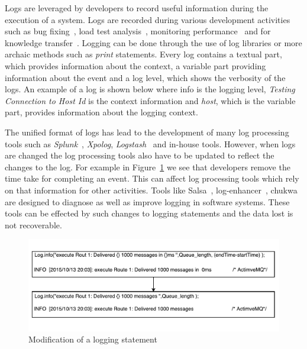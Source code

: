 Logs are leveraged by developers to record useful information during the execution of a system. Logs are recorded during various development activities such as bug fixing~\cite{ConsoleLogs,JGLouMining,QFuanomaly}, load test analysis~\cite{Automatic}, monitoring performance~\cite{Yuan} and for knowledge transfer~\cite{IanWCRE}.
Logging can be done through the use of log libraries or more archaic methods such as \textsl{print} statements. Every log contains a textual part, which provides information about the context, a variable part providing information about the event and a log level, which shows the verbosity of the logs. An example of a log is shown below where info is the logging level, \textsl{Testing Connection to Host Id} is the context information and \textsl{host}, which is the variable part, provides information about the logging context.

The unified format of logs has lead to the development of many log processing tools such as \textsl{Splunk}~\cite{carasso2012exploring}, \textsl{Xpolog}, \textsl{Logstash}~\cite{xu2013detecting} and in-house tools. However, when logs are changed the log processing tools also have to be updated to reflect the changes to the log. For example in Figure~\ref{fig:ExampleOfLogChange_LPA} we see that developers remove the time take for completing an event. This can affect log processing tools which rely on that information for other activities. Tools like Salsa~\cite{TanSalsa}, log-enhancer~\cite{Yuan}, chukwa~\cite{chukwa} 	are designed to diagnose as well as improve logging in software systems. These tools can be effected by such changes to logging statements and the data lost is not recoverable.



\begin{figure}[tb]
\centering
\includegraphics[width=1\columnwidth]{ExampleOfLogChange_LPA}
\caption{Modification of a logging statement}
\label{fig:ExampleOfLogChange_LPA}
\end{figure}



